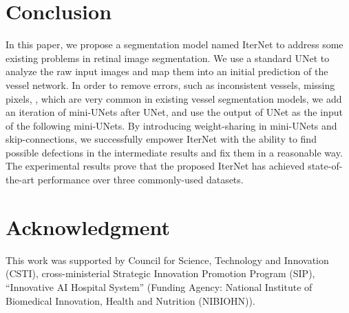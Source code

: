 \documentclass[10pt,twocolumn,letterpaper]{article}
\begin{document}
\section{Conclusion}\label{conclusion_section}

In this paper, we propose a segmentation model named IterNet to address some existing problems in retinal image segmentation. We use a standard UNet to analyze the raw input images and map them into an initial prediction of the vessel network. In order to remove errors, such as inconsistent vessels, missing pixels, \etc, which are very common in existing vessel segmentation models, we add an iteration of mini-UNets after UNet, and use the output of UNet as the input of the following mini-UNets. By introducing weight-sharing in mini-UNets and skip-connections, we successfully empower IterNet with the ability to find possible defections in the intermediate results and fix them in a reasonable way. The experimental results prove that the proposed IterNet has achieved state-of-the-art performance over three commonly-used datasets.


\section*{Acknowledgment}
This work was supported by Council for Science, Technology and Innovation (CSTI), cross-ministerial Strategic Innovation Promotion Program (SIP), ``Innovative AI Hospital System'' (Funding Agency: National Institute of Biomedical Innovation, Health and Nutrition (NIBIOHN)).
\end{document}
